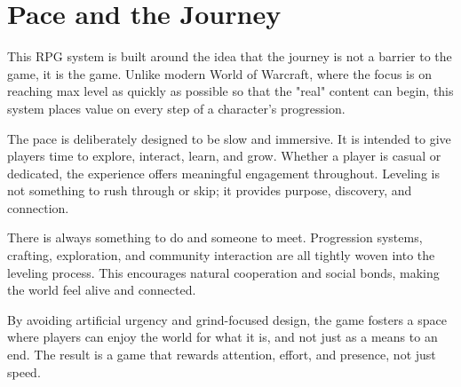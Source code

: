 \section{Pace and the Journey}

This RPG system is built around the idea that the journey is not a barrier to the game, it is the game. Unlike modern World of Warcraft, where the focus is on reaching max level as quickly as possible so that the "real" content can begin, this system places value on every step of a character's progression.

The pace is deliberately designed to be slow and immersive. It is intended to give players time to explore, interact, learn, and grow. Whether a player is casual or dedicated, the experience offers meaningful engagement throughout. Leveling is not something to rush through or skip; it provides purpose, discovery, and connection.

There is always something to do and someone to meet. Progression systems, crafting, exploration, and community interaction are all tightly woven into the leveling process. This encourages natural cooperation and social bonds, making the world feel alive and connected.

By avoiding artificial urgency and grind-focused design, the game fosters a space where players can enjoy the world for what it is, and not just as a means to an end. The result is a game that rewards attention, effort, and presence, not just speed.


